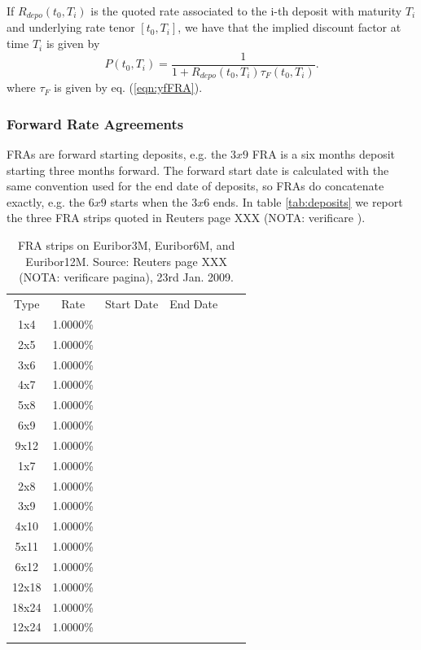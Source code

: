 \documentclass[11pt,reqno]{amsart}
\begin{document}
If $R_{depo}\left(t_0,T_i\right)$ is the quoted rate associated to the i-th deposit with maturity $T_i$ and underlying rate tenor $\left[t_0,T_i\right]$, we have that the implied discount factor at time $T_i$ is given by
\begin{equation}
P(t_0,T_i) = \frac{1}{1 + R_{depo}\left(t_0,T_i\right)\tau_F\left(t_0,T_i\right)}.
\label{eqn:deposit}
\end{equation}
where $\tau_F$ is given by eq. (\ref{eqn:yfFRA}).

\subsubsection{\label{SecFRA}Forward Rate Agreements}
FRAs are forward starting deposits, e.g. the $3x9$ FRA is a six months deposit starting three months forward. The forward start date is calculated with the same convention used for the end date of deposits, so FRAs do concatenate exactly, e.g. the $6x9$ starts when the $3x6$ ends.
In table \ref{tab:deposits} we report the three FRA strips quoted in Reuters page XXX (NOTA: verificare ).
\begin{table}[tbp]
\label{tab:FRA}
\begin{tabular}{cccccc}
Type & Rate & Start Date & End Date &  &  \\
1x4 & 1.0000\% &  &  &  &  \\
2x5 & 1.0000\% &  &  &  &  \\
3x6 & 1.0000\% &  &  &  &  \\
4x7 & 1.0000\% &  &  &  &  \\
5x8 & 1.0000\% &  &  &  &  \\
6x9 & 1.0000\% &  &  &  &  \\
9x12 & 1.0000\% &  &  &  &  \\
1x7 & 1.0000\% &  &  &  &  \\
2x8 & 1.0000\% &  &  &  &  \\
3x9 & 1.0000\% &  &  &  &  \\
4x10 & 1.0000\% &  &  &  &  \\
5x11 & 1.0000\% &  &  &  &  \\
6x12 & 1.0000\% &  &  &  &  \\
12x18 & 1.0000\% &  &  &  &  \\
18x24 & 1.0000\% &  &  &  &  \\
12x24 & 1.0000\% &  &  &  &  \\
&  &  &  &  &
\end{tabular}%
\caption{FRA strips on Euribor3M, Euribor6M, and Euribor12M. Source: Reuters page XXX (NOTA: verificare pagina), 23rd Jan. 2009.}
\end{table}
\end{document}
